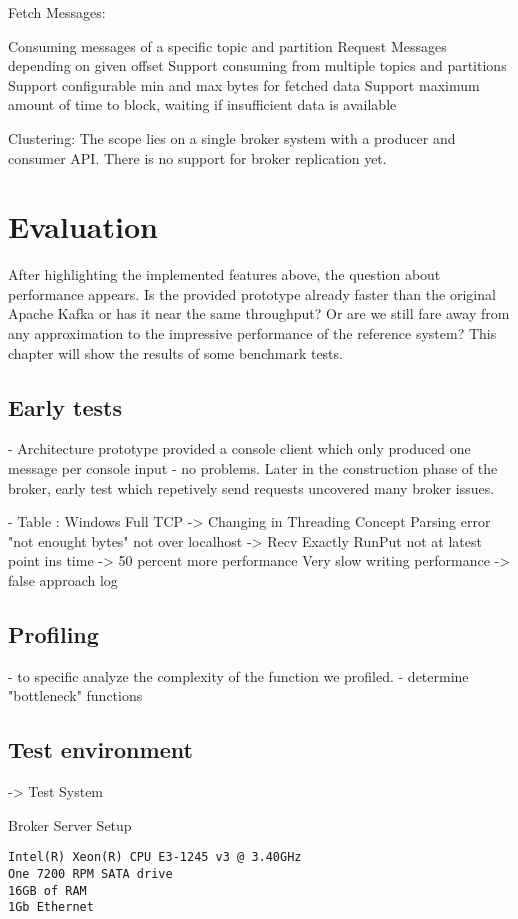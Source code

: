 Fetch Messages: 
\begin{itemize}
        \tick Consuming messages of a specific topic and partition
        \tick Request Messages depending on given offset
        \fail Support consuming from multiple topics and partitions 
        \fail Support configurable min and max bytes for fetched data
        \fail Support maximum amount of time to block, waiting if insufficient
        data is available
\end{itemize}
Clustering: The scope lies on a single broker system with a producer and
consumer API. There is no support for broker replication yet. 

\section{Evaluation}
After highlighting the implemented features above, the question about
performance appears. Is the provided prototype already faster than the original
Apache Kafka or has it near the same throughput? Or are we still fare away from any
approximation to the impressive performance of the reference system? This
chapter will show the results of some benchmark tests.

\subsection{Early tests}
- Architecture prototype provided a console client which only produced one
message per console input - no problems. Later in the construction phase of the broker, early test
which repetively send requests uncovered many broker issues. 

- Table : 
Windows Full TCP -> Changing in Threading Concept
Parsing error "not enought bytes" not over localhost -> Recv Exactly 
RunPut not at latest point ins time -> 50 percent more performance
Very slow writing performance -> false approach log

\subsection{Profiling}
- to specific analyze the complexity of the function we profiled. 
- determine "bottleneck" functions

\subsection{Test environment}
-> Test System

Broker Server Setup
\begin{verbatim}
Intel(R) Xeon(R) CPU E3-1245 v3 @ 3.40GHz
One 7200 RPM SATA drive
16GB of RAM
1Gb Ethernet 
\end{verbatim}

